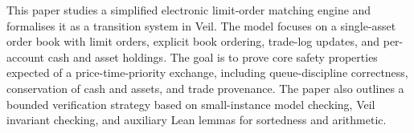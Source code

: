 This paper studies a simplified electronic limit-order matching engine and
formalises it as a transition system in Veil. The model focuses on a
single-asset order book with limit orders, explicit book ordering, trade-log
updates, and per-account cash and asset holdings. The goal is to prove core
safety properties expected of a price-time-priority exchange, including
queue-discipline correctness, conservation of cash and assets, and trade
provenance. The paper also outlines a bounded verification strategy based on
small-instance model checking, Veil invariant checking, and auxiliary Lean
lemmas for sortedness and arithmetic.
